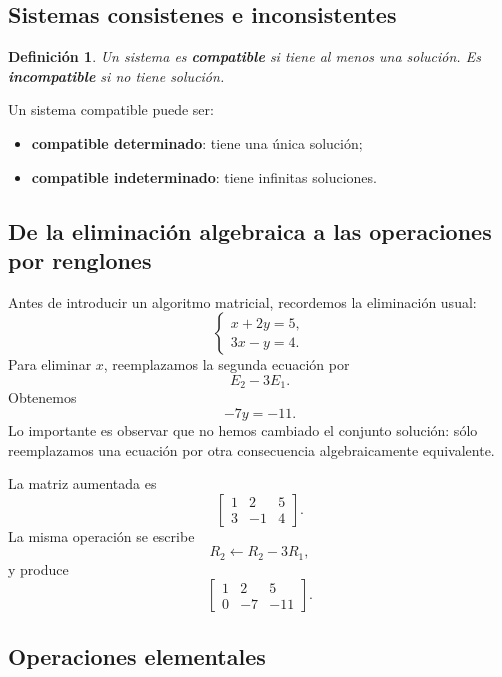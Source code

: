 \documentclass[12pt]{article}
\newtheorem{definicion}{Definición}[section]
\theoremstyle{remark}
\begin{document}
\subsection*{Sistemas consistenes e inconsistentes}

\begin{definicion}
Un sistema es \textbf{compatible} si tiene al menos una solución. Es \textbf{incompatible} si no tiene solución.
\end{definicion}

Un sistema compatible puede ser:
\begin{itemize}
\item \textbf{compatible determinado}: tiene una única solución;
\item \textbf{compatible indeterminado}: tiene infinitas soluciones.
\end{itemize}

\subsection*{De la eliminación algebraica a las operaciones por renglones}
Antes de introducir un algoritmo matricial, recordemos la eliminación usual:
\[
\begin{cases}
x+2y=5,\\
3x-y=4.
\end{cases}
\]
Para eliminar $x$, reemplazamos la segunda ecuación por
\[
E_2-3E_1.
\]
Obtenemos
\[
-7y=-11.
\]
Lo importante es observar que no hemos cambiado el conjunto solución: sólo reemplazamos una ecuación por otra consecuencia algebraicamente equivalente.

La matriz aumentada es
\[
\left[
\begin{array}{cc|c}
1&2&5\\
3&-1&4
\end{array}
\right].
\]
La misma operación se escribe
\[
R_2\leftarrow R_2-3R_1,
\]
y produce
\[
\left[
\begin{array}{cc|c}
1&2&5\\
0&-7&-11
\end{array}
\right].
\]
\subsection*{Operaciones elementales}
\end{document}
